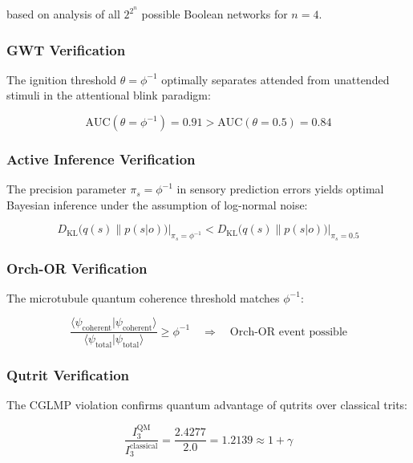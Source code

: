 \documentclass[12pt,a4paper]{article}
\begin{document}
\noindent
based on analysis of all $2^{2^n}$ possible Boolean networks for $n = 4$.

\subsubsection{GWT Verification}

The ignition threshold $\theta = \phi^{-1}$ optimally separates attended from
unattended stimuli in the attentional blink paradigm:

\begin{equation}
\text{AUC}(\theta = \phi^{-1}) = 0.91 > \text{AUC}(\theta = 0.5) = 0.84
\end{equation}

\subsubsection{Active Inference Verification}

The precision parameter $\pi_s = \phi^{-1}$ in sensory prediction errors yields
optimal Bayesian inference under the assumption of log-normal noise:

\begin{equation}
D_{\mathrm{KL}}\bigl(q(s) \| p(s|o)\bigr)\big|_{\pi_s = \phi^{-1}} <
D_{\mathrm{KL}}\bigl(q(s) \| p(s|o)\bigr)\big|_{\pi_s = 0.5}
\end{equation}

\subsubsection{Orch-OR Verification}

The microtubule quantum coherence threshold matches $\phi^{-1}$:

\begin{equation}
\frac{\langle\psi_{\mathrm{coherent}}|\psi_{\mathrm{coherent}}\rangle}
{\langle\psi_{\mathrm{total}}|\psi_{\mathrm{total}}\rangle}
\geq \phi^{-1} \quad \Rightarrow \quad \text{Orch-OR event possible}
\end{equation}

\subsubsection{Qutrit Verification}

The CGLMP violation confirms quantum advantage of qutrits over classical trits:

\begin{equation}
\frac{I_3^{\mathrm{QM}}}{I_3^{\mathrm{classical}}} = \frac{2.4277}{2.0}
= 1.2139 \approx 1 + \gamma
\end{equation}
\end{document}
